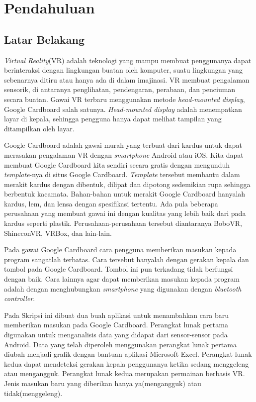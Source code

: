 \chapter{Pendahuluan}
\label{chap:pendahuluan}

\section{Latar Belakang}
\label{sec:latar_belakang}

\textit{Virtual Reality}(VR) adalah teknologi yang mampu membuat penggunanya dapat berinteraksi dengan lingkungan buatan oleh komputer, suatu lingkungan yang sebenarnya ditiru atau hanya ada di dalam imajinasi.\cite{parisi_2015} VR membuat pengalaman sensorik, di antaranya penglihatan, pendengaran, perabaan, dan penciuman secara buatan.\cite{kim_2005} Gawai VR terbaru menggunakan metode \textit{head-mounted display}, Google Cardboard salah satunya. \textit{Head-mounted display} adalah menempatkan layar di kepala, sehingga pengguna hanya dapat melihat tampilan yang ditampilkan oleh layar.\cite{vince_2004}

Google Cardboard\cite{googlevr} adalah gawai murah yang terbuat dari kardus untuk dapat merasakan pengalaman VR dengan \textit{smartphone} Android atau iOS. Kita dapat membuat Google Cardboard kita sendiri secara gratis dengan mengunduh \textit{template}-nya di situs Google Cardboard. \textit{Template} tersebut membantu dalam merakit kardus dengan dibentuk, dilipat dan dipotong sedemikian rupa sehingga berbentuk kacamata. Bahan-bahan untuk merakit Google Cardboard hanyalah kardus, lem, dan lensa dengan spesifikasi tertentu. Ada pula beberapa perusahaan yang membuat gawai ini dengan kualitas yang lebih baik dari pada kardus seperti plastik. Perusahaan-perusahaan tersebut diantaranya BoboVR, ShineconVR, VRBox, dan lain-lain.

Pada gawai Google Cardboard cara pengguna memberikan masukan kepada program sangatlah terbatas. Cara tersebut hanyalah dengan gerakan kepala dan tombol pada Google Cardboard. Tombol ini pun terkadang tidak berfungsi dengan baik. Cara lainnya agar dapat memberikan masukan kepada program adalah dengan menghubungkan \textit{smartphone} yang digunakan dengan \textit{bluetooth controller}.

Pada Skripsi ini dibuat dua buah aplikasi untuk menambahkan cara baru  memberikan masukan pada Google Cardboard.  Perangkat lunak pertama digunakan untuk menganalisis data yang didapat dari sensor-sensor pada Android. Data yang telah diperoleh menggunakan perangkat lunak pertama diubah menjadi grafik dengan bantuan aplikasi Microsoft Excel. Perangkat lunak kedua dapat mendeteksi gerakan kepala penggunanya ketika sedang menggeleng atau mengangguk. Perangkat lunak kedua merupakan permainan berbasis VR. Jenis masukan baru yang diberikan hanya ya(mengangguk) atau tidak(menggeleng).

